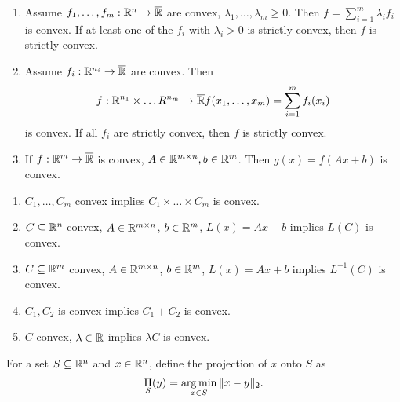 \begin{thm}
  \label{sec:convexity-10}
  \begin{enumerate}
  \item Assume $f_{1}, \dots, f_{m}: \mathbb{R}^{n} \rightarrow \overline {\mathbb{R}}$
    are convex, $\lambda_{1}, \dots, \lambda_{m} \geq 0$.  Then $f =
    \sum_{i=1}^{m} \lambda_{i} f_{i}$ is convex.  If at least one of
    the $f_{i}$ with $\lambda_{i} > 0$ is strictly convex, then $f$ is
    strictly convex.
  \item Assume $f_{i}: \mathbb{R}^{n_{i}} \rightarrow \overline {\mathbb{R}}$ are
    convex.  Then
    \begin{align}
      \label{eq:7}
      f: \mathbb{R}^{n_{1}} \times \dots R^{n_{m}} \rightarrow \overline {\mathbb{R}}
      f(x_{1}, \dots, x_{m}) = \sum_{i=1}^{m} f_{i}(x_{i})
    \end{align} is convex. If all $f_{i}$ are strictly convex, then
    $f$ is strictly convex.
  \item If $f: \mathbb{R}^{m} \rightarrow \overline {\mathbb{R}}$ is convex, $A \in
    \mathbb{R}^{m \times n}, b \in \mathbb{R}^{m}$.  Then $g(x) = f(Ax + b)$ is convex.
  \end{enumerate}
\end{thm}

\begin{thm}
  \label{sec:convexity-11}
  \begin{enumerate}
  \item $C_{1}, \dots, C_{m}$ convex implies $C_{1} \times \dots
    \times C_{m}$ is convex.
  \item $C \subseteq \mathbb{R}^{n}$ convex, $A \in \mathbb{R}^{m \times n}$, $b \in
    \mathbb{R}^{m}$, $L(x) = Ax + b$ implies $L(C)$ is convex.
  \item $C \subseteq \mathbb{R}^{m}$ convex, $A \in \mathbb{R}^{m \times n}$, $b \in
    \mathbb{R}^{m}$, $L(x) = Ax + b$ implies $L^{-1}(C)$ is convex.
  \item $C_{1}, C_{2}$ is convex implies $C_{1} + C_{2}$ is convex.
  \item $C$ convex, $\lambda \in \mathbb{R}$ implies $\lambda C$ is convex.
  \end{enumerate}
\end{thm}

\begin{defn}
  \label{sec:convexity-12}
  For a set $S \subseteq \mathbb{R}^{n}$ and $x \in \mathbb{R}^{n}$, define the
  projection of $x$ onto $S$ as
  \begin{equation}
    \label{eq:9}
    \operatorname*{\Pi}_{S}(y) = \operatorname*{arg\,min}_{x \in S} \|x - y\|_{2}.
  \end{equation}
\end{defn}

